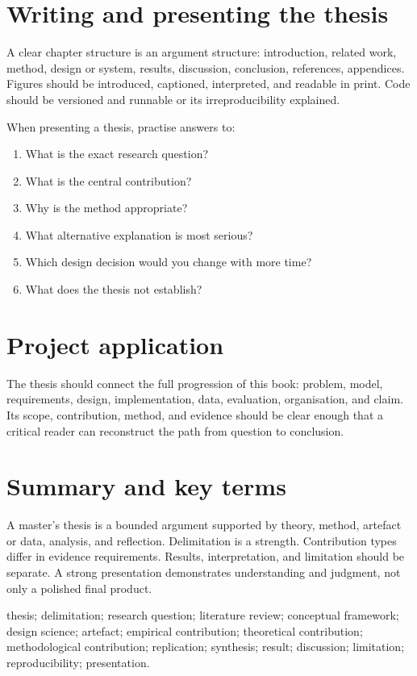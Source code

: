 \section{Writing and presenting the thesis}
A clear chapter structure is an argument structure: introduction, related work, method, design or system, results, discussion, conclusion, references, appendices. Figures should be introduced, captioned, interpreted, and readable in print. Code should be versioned and runnable or its irreproducibility explained.

When presenting a thesis, practise answers to:
\begin{enumerate}
\item What is the exact research question?
\item What is the central contribution?
\item Why is the method appropriate?
\item What alternative explanation is most serious?
\item Which design decision would you change with more time?
\item What does the thesis not establish?
\end{enumerate}

\section{Project application}
The thesis should connect the full progression of this book: problem, model, requirements, design, implementation, data, evaluation, organisation, and claim. Its scope, contribution, method, and evidence should be clear enough that a critical reader can reconstruct the path from question to conclusion.

\section{Summary and key terms}
A master's thesis is a bounded argument supported by theory, method, artefact or data, analysis, and reflection. Delimitation is a strength. Contribution types differ in evidence requirements. Results, interpretation, and limitation should be separate. A strong presentation demonstrates understanding and judgment, not only a polished final product.

\begin{keyterms}thesis; delimitation; research question; literature review; conceptual framework; design science; artefact; empirical contribution; theoretical contribution; methodological contribution; replication; synthesis; result; discussion; limitation; reproducibility; presentation.\end{keyterms}

